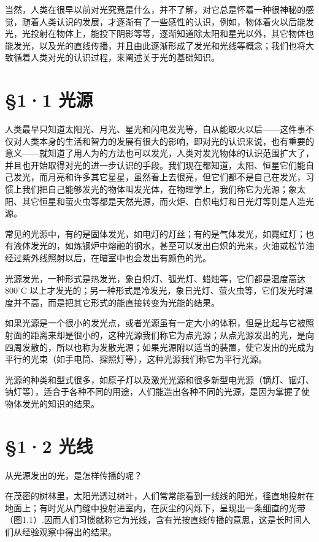 当然，人类在很早以前对光究竟是什么，并不了解，对它总是怀着一种很神秘的感觉，随着人类认识的发展，才逐渐有了一些感性的认识，例如，物体着火以后能发光，光投射在物体上，能投下阴影等等，逐渐知道除太阳和星光以外，其它物体也能发光，以及光的直线传播，并且由此逐渐形成了发光和光线等概念；我们也将大致循着人类对光的认识过程，来阐述关于光的基础知识。

\section{§1·1 光源}

人类最早只知道太阳光、月光、星光和闪电发光等，自从能取火以后------这件事不仅对人类本身的生活和智力的发展有很大的影响，即对光的认识来说，也有重要的意义------就知道了用人为的方法也可以发光，人类对发光物体的认识范围扩大了，并且也开始取得对光的进一步认识的手段。我们现在都知道，太阳、恒星它们能自己发光，而月亮和许多其它星星，虽然看上去很亮，但它们都不是自己在发光，习惯上我们把自己能够发光的物体叫发光体，在物理学上，我们称它为光源；象太阳、其它恒星和萤火虫等都是天然光源，而火炬、白炽电灯和日光灯等则是人造光源。

常见的光源中，有的是固体发光，如电灯的灯丝；有的是气体发光，如霓虹灯；也有液体发光的，如炼钢炉中熔融的钢水，甚至可以发出白炽的光来，火油或松节油经过紫外线照射以后，在暗室中也会发出有颜色的光。

光源发光，一种形式是热发光，象白炽灯、弧光灯、蜡烛等，它们都是温度高达
\(800^{\circ} \mathrm{C}\)
以上才发光的；另一种形式是冷发光，象日光灯、萤火虫等，它们发光时温度并不高，而是把其它形式的能直接转变为光能的结果。

如果光源是一个很小的发光点，或者光源虽有一定大小的体积，但是比起与它被照射面的距离来却是很小的，这种光源我们称它为点光源；从点光源发出的光，是向四周发散的，所以也称为发散光源；如果光源附以适当的装置，使它发出的光成为平行的光束（如手电筒、探照灯等），这种光源我们称它为平行光源。

光源的种类和型式很多，如原子灯以及激光光源和很多新型电光源（镝灯、铟灯、钠灯等），适合于各种不同的用途，人们能造出各种不同的光源，是因为掌握了使物体发光的知识的结果。

\section{§1·2 光线}

从光源发出的光，是怎样传播的呢？

在茂密的树林里，太阳光透过树叶，人们常常能看到一线线的阳光，径直地投射在地面上；有时光从门缝中投射进室内，在灰尘的闪烁下，呈现出一条细直的光带（图1.1）.因而人们习惯就称它为光线，含有光按直线传播的意思，这是长时间人们从经验观察中得出的结果。

